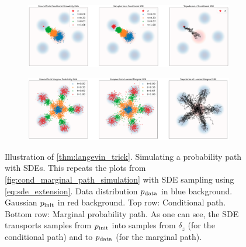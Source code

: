 \begin{figure}[t!]
\centering
   \begin{subfigure}[b]{\textwidth}
   \centering
   \includegraphics[width=\textwidth]{figures/conditional_sde.png}
   \label{fig:Ng1} 
\end{subfigure}
\begin{subfigure}[b]{\textwidth}
    \centering
   \includegraphics[width=\textwidth]{figures/marginal_sde.png}
   \label{fig:Ng2}
\end{subfigure}
\caption{\label{fig:thm_sde_extension}Illustration of \cref{thm:langevin_trick}. Simulating a probability path with SDEs. This repeats the plots from \cref{fig:cond_marginal_path_simulation} with SDE sampling using \cref{eq:sde_extension}. Data distribution $p_{\rm{data}}$ in blue background. Gaussian $p_{\rm{init}}$ in red background. Top row: Conditional path. Bottom row: Marginal probability path. As one can see, the SDE transports samples from $p_{\rm{init}}$ into samples from $\delta_{z}$ (for the conditional path) and to $p_{\rm{data}}$ (for the marginal path).}
\end{figure}

